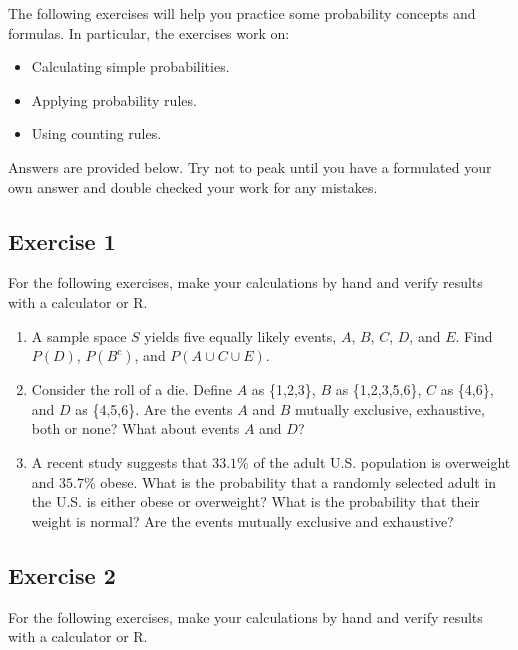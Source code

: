 \documentclass[
  letterpaper,
  DIV=11,
  numbers=noendperiod]{scrreprt}
\begin{document}
The following exercises will help you practice some probability concepts
and formulas. In particular, the exercises work on:

\begin{itemize}
\item
  Calculating simple probabilities.
\item
  Applying probability rules.
\item
  Using counting rules.
\end{itemize}

Answers are provided below. Try not to peak until you have a formulated
your own answer and double checked your work for any mistakes.

\hypertarget{exercise-1-14}{%
\subsection*{Exercise 1}\label{exercise-1-14}}

For the following exercises, make your calculations by hand and verify
results with a calculator or R.

\begin{enumerate}
\def\labelenumi{\arabic{enumi}.}
\item
  A sample space \(S\) yields five equally likely events, \(A\), \(B\),
  \(C\), \(D\), and \(E\). Find \(P(D)\), \(P(B^c)\), and
  \(P(A \cup C \cup E)\).
\item
  Consider the roll of a die. Define \(A\) as \{1,2,3\}, \(B\) as
  \{1,2,3,5,6\}, \(C\) as \{4,6\}, and \(D\) as \{4,5,6\}. Are the
  events \(A\) and \(B\) mutually exclusive, exhaustive, both or none?
  What about events \(A\) and \(D\)?
\item
  A recent study suggests that \(33.1\)\% of the adult U.S. population
  is overweight and \(35.7\)\% obese. What is the probability that a
  randomly selected adult in the U.S. is either obese or overweight?
  What is the probability that their weight is normal? Are the events
  mutually exclusive and exhaustive?
\end{enumerate}

\hypertarget{exercise-2-14}{%
\subsection*{Exercise 2}\label{exercise-2-14}}

For the following exercises, make your calculations by hand and verify
results with a calculator or R.
\end{document}

